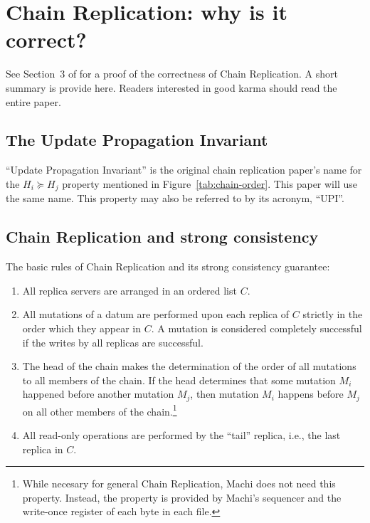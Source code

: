 \documentclass[preprint,10pt]{sigplanconf}
\begin{document}
\appendix

\section{Chain Replication: why is it correct?}
\label{sec:cr-proof}

See Section~3 of \cite{chain-replication} for a proof of the
correctness of Chain Replication.  A short summary is provide here.
Readers interested in good karma should read the entire paper.

\subsection{The Update Propagation Invariant}
\label{sub:upi}

``Update Propagation Invariant'' is the original chain replication
paper's name for the
$H_i \succeq H_j$
property mentioned in Figure~\ref{tab:chain-order}.
This paper will use the same name.
This property may also be referred to by its acronym, ``UPI''.

\subsection{Chain Replication and strong consistency}

The basic rules of Chain Replication and its strong
consistency guarantee:

\begin{enumerate}

\item All replica servers are arranged in an ordered list $C$.

\item All mutations of a datum are performed upon each replica of $C$
  strictly in the order which they appear in $C$.  A mutation is considered
  completely successful if the writes by all replicas are successful.

\item The head of the chain makes the determination of the order of
  all mutations to all members of the chain.  If the head determines
  that some mutation $M_i$ happened before another mutation $M_j$,
  then mutation $M_i$ happens before $M_j$ on all other members of
  the chain.\footnote{While necesary for general Chain Replication,
    Machi does not need this property.  Instead, the property is
    provided by Machi's sequencer and the write-once register of each
    byte in each file.}

\item All read-only operations are performed by the ``tail'' replica,
  i.e., the last replica in $C$.

\end{enumerate}
\end{document}
